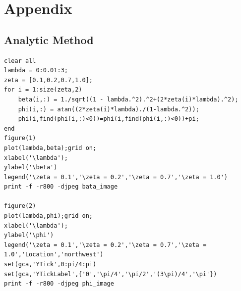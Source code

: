 \documentclass[12pt,a4paper]{article}
\begin{document}
\section{Appendix}
\subsection{Analytic Method}
\begin{lstlisting}
clear all
lambda = 0:0.01:3;
zeta = [0.1,0.2,0.7,1.0];
for i = 1:size(zeta,2)
	beta(i,:) = 1./sqrt((1 - lambda.^2).^2+(2*zeta(i)*lambda).^2);
	phi(i,:) = atan((2*zeta(i)*lambda)./(1-lambda.^2));
    phi(i,find(phi(i,:)<0))=phi(i,find(phi(i,:)<0))+pi;
end
figure(1)
plot(lambda,beta);grid on;
xlabel('\lambda');
ylabel('\beta')
legend('\zeta = 0.1','\zeta = 0.2','\zeta = 0.7','\zeta = 1.0')
print -f -r800 -djpeg bata_image

figure(2)
plot(lambda,phi);grid on;
xlabel('\lambda');
ylabel('\phi')
legend('\zeta = 0.1','\zeta = 0.2','\zeta = 0.7','\zeta = 1.0','Location','northwest')
set(gca,'YTick',0:pi/4:pi)
set(gca,'YTickLabel',{'0','\pi/4','\pi/2','(3\pi)/4','\pi'})
print -f -r800 -djpeg phi_image
\end{lstlisting}
\end{document}
